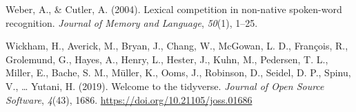 \documentclass[
  english,
  man,floatsintext]{apa7}
\newlength{\cslhangindent}
\newenvironment{CSLReferences}[2] %
 {%
  \setlength{\parindent}{0pt}
  \ifodd #1 \everypar{\setlength{\hangindent}{\cslhangindent}}\ignorespaces\fi
  \ifnum #2 > 0
  \setlength{\parskip}{#2\baselineskip}
  \fi
 }%
 {}
\begin{document}
\begin{CSLReferences}{1}{0}
\leavevmode{}%
Weber, A., \& Cutler, A. (2004). Lexical competition in non-native spoken-word recognition. \emph{Journal of Memory and Language}, \emph{50}(1), 1--25.

\leavevmode{}%
Wickham, H., Averick, M., Bryan, J., Chang, W., McGowan, L. D., François, R., Grolemund, G., Hayes, A., Henry, L., Hester, J., Kuhn, M., Pedersen, T. L., Miller, E., Bache, S. M., Müller, K., Ooms, J., Robinson, D., Seidel, D. P., Spinu, V., \ldots{} Yutani, H. (2019). Welcome to the {tidyverse}. \emph{Journal of Open Source Software}, \emph{4}(43), 1686. \url{https://doi.org/10.21105/joss.01686}

\end{CSLReferences}

\endgroup

\newpage
\end{document}
